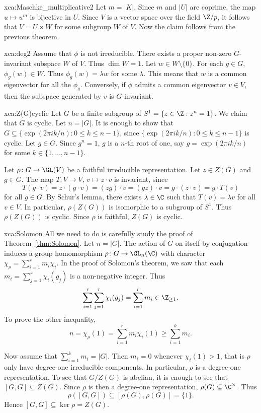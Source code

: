 \begin{sol}{xca:Maschke_multiplicative2}
    Let $m=|K|$. Since $m$ and $|U|$ are coprime, the map 
    $u\mapsto u^m$ is bijective in $U$. Since $V$ is a vector space over the field 
    $\Z/p$, it follows that $V=U\times W$ for some subgroup $W$ of $V$. Now the claim follows
    from the previous theorem. 
\end{sol}

\begin{sol}{xca:deg2}
  Assume that $\phi$ is not irreducible. There exists a proper non-zero $G$-invariant 
  subspace $W$ of $V$. Thus $\dim W=1$. Let $w\in W\setminus\{0\}$.
  For each $g\in G$, $\phi_g(w)\in W$. Thus $\phi_g(w)=\lambda w$ for some 
  $\lambda$. This means that $w$ is a common eigenvector for all the $\phi_g$.
  Conversely, if $\phi$ admits a common eigenvector $v\in V$, then 
  the subspace generated by $v$ is $G$-invariant.
\end{sol}

\begin{sol}{xca:Z(G)cyclic}
Let $G$ be a finite subgroup of $S^1=\{z\in\Z:z^n=1\}$. We claim that $G$ is cyclic. Let $n=|G|$. 
It is enough to show that 
$G\subseteq\{\exp(2\pi ik/n):0\leq k\leq n-1\}$, 
since $\{\exp(2\pi ik/n):0\leq k\leq n-1\}$ is
cyclic. 
Let $g\in G$. 
Since $g^n=1$, $g$ is a $n$-th root of one, say 
$g=\exp(2\pi i k/n)$ for some $k\in\{1,\dots,n-1\}$. 

Let $\rho\colon G\to\GL(V)$ be a faithful irreducible 
representation. Let $z\in Z(G)$ and $g\in G$. The map 
$T\colon V\to V$, $v\mapsto z\cdot v$ is invariant, since
\[
T(g\cdot v)=z\cdot (g\cdot v)
=(zg)\cdot v=(gz)\cdot v=g\cdot (z\cdot v)=g\cdot T(v)
\]
for all $g\in G$. By Schur's lemma, there exists $\lambda\in\C$ such that $T(v)=\lambda v$
for all $v\in V$. In particular,
$\rho(Z(G))$ is isomorphic to a subgroup of $S^1$. 
Thus $\rho(Z(G))$ is cyclic. Since $\rho$ is faithful, 
$Z(G)$ is cyclic. 
\end{sol}

\begin{sol}{xca:Solomon}
    All we need to do is carefully study the proof
    of Theorem~\ref{thm:Solomon}. Let $n=|G|$. 
    The action of $G$ on itself by conjugation induces a group homomorphism $\rho\colon G\to\GL_n(\C)$ with character 
    $\chi_\rho=\sum_{i=1}^rm_i\chi_i$. In the proof of 
    Solomon's theorem, we saw that 
    each $m_i=\sum_{j=1}^r\chi_i(g_j)$ is a non-negative integer. Thus 
    \[
    \sum_{i=1}^r\sum_{j=1}^r\chi_i(g_j)=\sum_{i=1}^rm_i\in\Z_{\geq1}. 
    \]
    To prove the other inequality, 
    \[
    n=\chi_\rho(1)=\sum_{i=1}^rm_i\chi_i(1)\geq\sum_{i=1}^km_i.
    \]

    Now assume that $\sum_{i=1}^km_i=|G|$. Then $m_i=0$ whenever 
    $\chi_i(1)>1$, that is 
    $\rho$ only have degree-one 
    irreducible components. In particular, $\rho$ is a degree-one
    representation. To see that $G/Z(G)$ is abelian, it is enough to see that $[G,G]\subseteq Z(G)$. Since $\rho$ is then
    a degree-one representation, $\rho(G)\subseteq\C^{\times}$. Thus 
    \[
    \rho([G,G])\subseteq [\rho(G),\rho(G)]=\{1\}.
    \]
    Hence $[G,G]\subseteq\ker\rho=Z(G)$. 
\end{sol}

